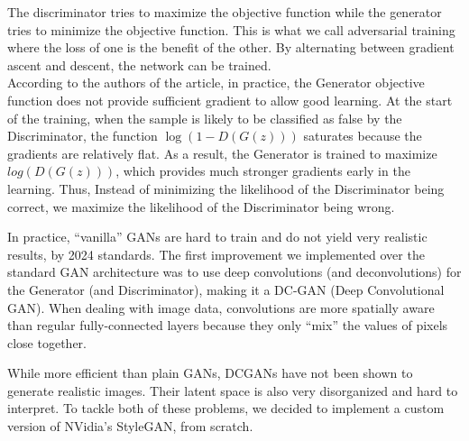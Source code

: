 \documentclass{article}
\begin{document}
The discriminator tries to maximize the objective function while the generator tries to minimize the objective function. This is what we call adversarial training where the loss of one is the benefit of the other. By alternating between gradient ascent and descent, the network can be trained.\\

According to the authors of the article, in practice, the Generator objective function does not provide sufficient gradient to allow good learning. At the start of the training, when the sample is likely to be classified as false by the Discriminator, the function $\log(1 - D(G(z)))$  saturates because the gradients are relatively flat. As a result, the Generator is trained to maximize $log(D(G(z)))$, which provides much stronger gradients early in the learning. Thus, Instead of minimizing the likelihood of the Discriminator being correct, we maximize the likelihood of the Discriminator being wrong. 

In practice, “vanilla” GANs are hard to train and do not yield very realistic results, by 2024 standards. The first improvement we implemented over the standard GAN architecture was to use deep convolutions (and deconvolutions) for the Generator (and Discriminator), making it a DC-GAN (Deep Convolutional GAN). When dealing with image data, convolutions are more spatially aware than regular fully-connected layers because they only “mix” the values of pixels close together.

While more efficient than plain GANs, DCGANs have not been shown to generate realistic images. Their latent space is also very disorganized and hard to interpret. To tackle both of these problems, we decided to implement a custom version of NVidia’s StyleGAN, from scratch.
\end{document}
